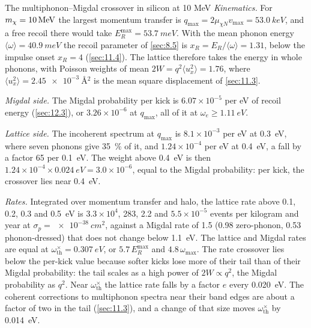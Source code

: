 \begin{workedexample}{The multiphonon--Migdal crossover in silicon at 10 MeV}\label{we:17-crossover}
\emph{Kinematics.} For $m_{\chi} = \SI{10}{MeV}$ the largest momentum transfer is $q_{\mathrm{max}} = 2\mu_{\chi N}v_{\mathrm{max}} = \SI{53.0}{keV}$, and a free recoil there would take $E_R^{\mathrm{max}} = \SI{53.7}{meV}$. With the mean phonon energy $\langle\omega\rangle = \SI{40.9}{meV}$ the recoil parameter of \cref{sec:8.5} is $x_R = E_R/\langle\omega\rangle = 1.31$, below the impulse onset $x_R = 4$ (\cref{sec:11.4}). The lattice therefore takes the energy in whole phonons, with Poisson weights of mean $2W = q^2\langle u_x^2\rangle = 1.76$, where $\langle u_x^2\rangle = \SI{2.45e-3}{\angstrom^2}$ is the mean square displacement of \cref{sec:11.3}.

\emph{Migdal side.} The Migdal probability per kick is $6.07\times10^{-5}$ per eV of recoil energy (\cref{sec:12.3}), or $3.26\times10^{-6}$ at $q_{\mathrm{max}}$, all of it at $\omega_e \ge \SI{1.11}{eV}$.

\emph{Lattice side.} The incoherent spectrum at $q_{\mathrm{max}}$ is $8.1\times10^{-3}$ per eV at \SI{0.3}{eV}, where seven phonons give \SI{35}{\percent} of it, and $1.24\times10^{-4}$ per eV at \SI{0.4}{eV}, a fall by a factor 65 per \SI{0.1}{eV}. The weight above \SI{0.4}{eV} is then $1.24\times10^{-4} \times \SI{0.024}{eV} = 3.0\times10^{-6}$, equal to the Migdal probability: per kick, the crossover lies near \SI{0.4}{eV}.

\emph{Rates.} Integrated over momentum transfer and halo, the lattice rate above 0.1, 0.2, 0.3 and \SI{0.5}{eV} is $3.3\times10^4$, 283, 2.2 and $5.5\times10^{-5}$ events per kilogram and year at $\sigma_p = \SI{e-38}{cm^2}$, against a Migdal rate of 1.5 (0.98 zero-phonon, 0.53 phonon-dressed) that does not change below \SI{1.1}{eV}. The lattice and Migdal rates are equal at $\omega_{\mathrm{th}}^\times = \SI{0.307}{eV}$, or $5.7\,E_R^{\mathrm{max}}$ and $4.8\,\omega_{\mathrm{max}}$. The rate crossover lies below the per-kick value because softer kicks lose more of their tail than of their Migdal probability: the tail scales as a high power of $2W \propto q^2$, the Migdal probability as $q^2$. Near $\omega_{\mathrm{th}}^\times$ the lattice rate falls by a factor $e$ every \SI{0.020}{eV}. The coherent corrections to multiphonon spectra near their band edges are about a factor of two in the tail (\cref{sec:11.3}), and a change of that size moves $\omega_{\mathrm{th}}^\times$ by \SI{0.014}{eV}.
\end{workedexample}

